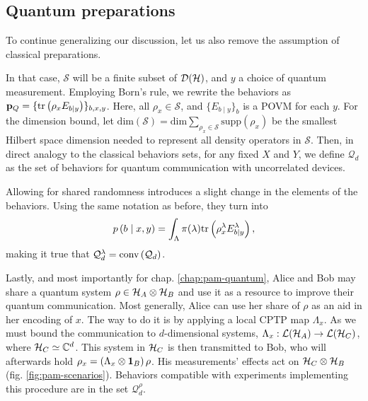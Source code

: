        \subsection{Quantum preparations}
        \label{sec:quantum-behaviors}

            To continue generalizing our discussion, let us also remove the assumption of classical preparations. 
            
            In that case, $\mathcal{S}$ will be a finite subset of $\mathcal{D}(\mathcal{H})$, and $y$ a choice of quantum measurement. Employing Born's rule, we rewrite the behaviors as $\mathbf{p}_Q = \{ \text{tr}\left( \rho_x E_{b \vert y} \right) \}_{b,x,y}$. Here, all $\rho_x \in \mathcal{S}$, and $\{ E_{b \mid y} \}_b$ is a POVM for each $y$. For the dimension bound, let $\text{dim}(\mathcal{S}) = \text{dim} \sum_{\rho_x \in \mathcal{S}}\text{supp}\left( \rho_x \right)$ be the smallest Hilbert space dimension needed to represent all density operators in $\mathcal{S}$. Then, in direct analogy to the classical behaviors sets, for any fixed $X$ and $Y$, we define $\mathcal{Q}_d$ as the set of behaviors for quantum communication with uncorrelated devices.
            
            Allowing for shared randomness introduces a slight change in the elements of the behaviors. Using the same notation as before, they turn into
            $$
                p \left( b \mid x,y \right) =  \int_\Lambda \pi(\lambda) \text{tr}\left( \rho_x^\lambda E_{b \vert y}^\lambda \right),
            $$
            making it true that $\mathcal{Q}_d^\lambda = \text{conv} \left( \mathcal{Q}_d \right)$.
            
            Lastly, and most importantly for chap. \ref{chap:pam-quantum}, Alice and Bob may share a quantum system $\rho \in \mathcal{H}_A \otimes \mathcal{H}_B$ and use it as a resource to improve their quantum communication. Most generally, Alice can use her share of $\rho$ as an aid in her encoding of $x$. The way to do it is by applying a local CPTP map $\Lambda_x$. As we must bound the communication to $d$-dimensional systems, $\Lambda_x : \mathcal{L}(\mathcal{H}_A) \rightarrow \mathcal{L}(\mathcal{H}_C)$, where $\mathcal{H}_C \simeq \mathbb{C}^d$. This system in $\mathcal{H}_C$ is then transmitted to Bob, who will afterwards hold $\rho_x = \left( \Lambda_x \otimes \mathbf{1}_B \right) \rho$. His measurements' effects act on $\mathcal{H}_C \otimes \mathcal{H}_B$ (fig. \ref{fig:pam-scenarios}). Behaviors compatible with experiments implementing this procedure are in the set $\mathcal{Q}^\rho_{d}$.
            
